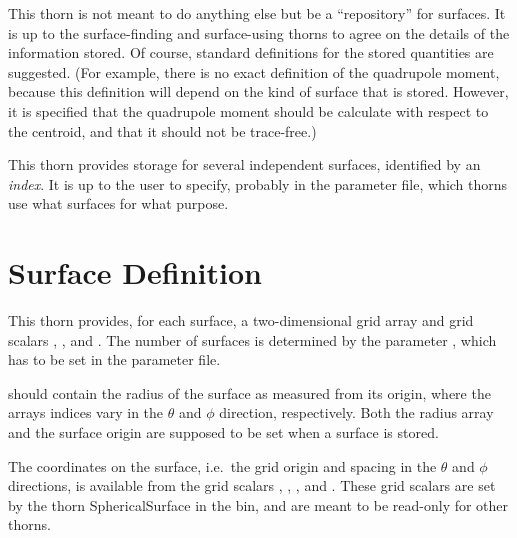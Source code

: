 This thorn is not meant to do anything else but be a ``repository''
for surfaces.  It is up to the surface-finding and surface-using
thorns to agree on the details of the information stored.  Of course,
standard definitions for the stored quantities are suggested.  (For
example, there is no exact definition of the quadrupole moment,
because this definition will depend on the kind of surface that is
stored.  However, it is specified that the quadrupole moment should be
calculate with respect to the centroid, and that it should not be
trace-free.)

This thorn provides storage for several independent surfaces,
identified by an \emph{index}.  It is up to the user to specify,
probably in the parameter file, which thorns use what surfaces for
what purpose.



\section{Surface Definition}

This thorn provides, for each surface, a two-dimensional grid array
 and grid scalars ,
, and .  The number of
surfaces is determined by the parameter , which has
to be set in the parameter file.

 should contain the radius of the surface as
measured from its origin, where the arrays indices vary in the
$\theta$ and $\phi$ direction, respectively.  Both the radius array
and the surface origin are supposed to be set when a surface is
stored.

The coordinates on the surface, i.e.\ the grid origin and spacing in
the $\theta$ and $\phi$ directions, is available from the grid scalars
, ,
, and .  These grid
scalars are set by the thorn SphericalSurface in the 
bin, and are meant to be read-only for other thorns.



